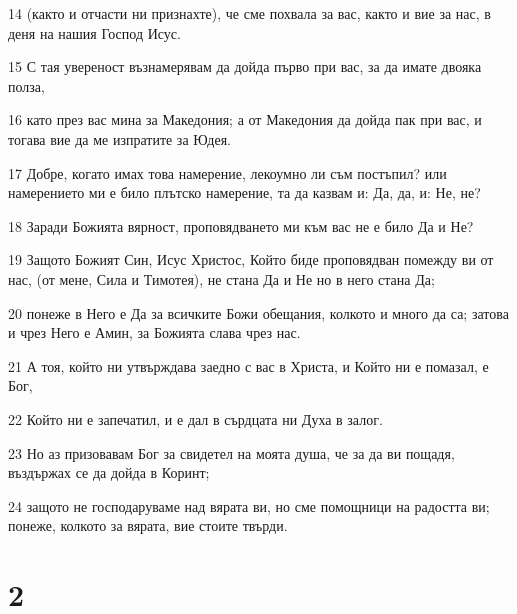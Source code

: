 \par 14 (както и отчасти ни признахте), че сме похвала за вас, както и вие за нас, в деня на нашия Господ Исус.
\par 15 С тая увереност възнамерявам да дойда първо при вас, за да имате двояка полза,
\par 16 като през вас мина за Македония; а от Македония да дойда пак при вас, и тогава вие да ме изпратите за Юдея.
\par 17 Добре, когато имах това намерение, лекоумно ли съм постъпил? или намерението ми е било плътско намерение, та да казвам и: Да, да, и: Не, не?
\par 18 Заради Божията вярност, проповядването ми към вас не е било Да и Не?
\par 19 Защото Божият Син, Исус Христос, Който биде проповядван помежду ви от нас, (от мене, Сила и Тимотея), не стана Да и Не но в него стана Да;
\par 20 понеже в Него е Да за всичките Божи обещания, колкото и много да са; затова и чрез Него е Амин, за Божията слава чрез нас.
\par 21 А тоя, който ни утвърждава заедно с вас в Христа, и Който ни е помазал, е Бог,
\par 22 Който ни е запечатил, и е дал в сърдцата ни Духа в залог.
\par 23 Но аз призовавам Бог за свидетел на моята душа, че за да ви пощадя, въздържах се да дойда в Коринт;
\par 24 защото не господаруваме над вярата ви, но сме помощници на радостта ви; понеже, колкото за вярата, вие стоите твърди.

\chapter{2}

